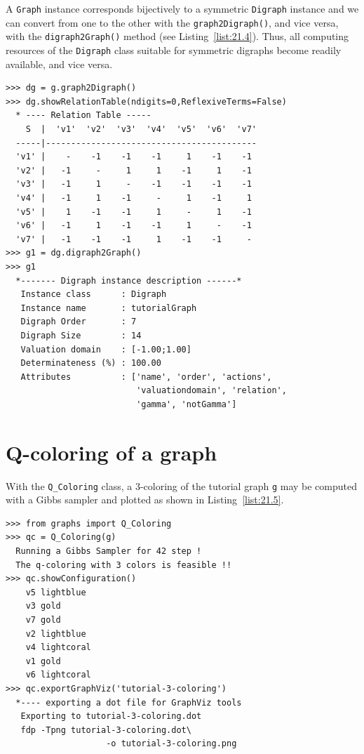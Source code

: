 A \texttt{Graph} instance corresponds bijectively to a symmetric \texttt{Digraph} instance and we can convert from one to the other with the \texttt{graph2Digraph()}, and vice versa, with the \texttt{digraph2Graph()} method (see Listing~\vref{list:21.4}). Thus, all computing resources of the \texttt{Digraph} class suitable for symmetric digraphs become readily available, and vice versa.
\begin{lstlisting}[caption={Conversion between graphs and digraphs},label=list:21.4]
>>> dg = g.graph2Digraph()
>>> dg.showRelationTable(ndigits=0,ReflexiveTerms=False)
  * ---- Relation Table -----
    S  |  'v1'  'v2'  'v3'  'v4'  'v5'  'v6'  'v7'	  
  -----|------------------------------------------
  'v1' |    -    -1    -1    -1     1    -1    -1	 
  'v2' |   -1     -     1     1    -1     1    -1	 
  'v3' |   -1     1     -    -1    -1    -1    -1	 
  'v4' |   -1     1    -1     -     1    -1     1	 
  'v5' |    1    -1    -1     1     -     1    -1	 
  'v6' |   -1     1    -1    -1     1     -    -1	 
  'v7' |   -1    -1    -1     1    -1    -1     -
>>> g1 = dg.digraph2Graph()
>>> g1
  *------- Digraph instance description ------*
   Instance class      : Digraph
   Instance name       : tutorialGraph
   Digraph Order       : 7
   Digraph Size        : 14
   Valuation domain    : [-1.00;1.00]
   Determinateness (%) : 100.00
   Attributes          : ['name', 'order', 'actions',
                          'valuationdomain', 'relation',
                          'gamma', 'notGamma']
\end{lstlisting}

\section{Q-coloring of a graph}
\label{25.2}

With the \texttt{Q\_Coloring} class, a 3-coloring of the tutorial graph \texttt{g} may be computed with a Gibbs sampler \citep{GEM-1984} and plotted as shown in Listing~\vref{list:21.5}.
\begin{lstlisting}[caption={Computing a 3-coloring of the random graph \texttt{g}},label=list:21.5]
>>> from graphs import Q_Coloring
>>> qc = Q_Coloring(g)
  Running a Gibbs Sampler for 42 step !
  The q-coloring with 3 colors is feasible !!
>>> qc.showConfiguration()
    v5 lightblue
    v3 gold
    v7 gold
    v2 lightblue
    v4 lightcoral
    v1 gold
    v6 lightcoral
>>> qc.exportGraphViz('tutorial-3-coloring')
  *---- exporting a dot file for GraphViz tools
   Exporting to tutorial-3-coloring.dot
   fdp -Tpng tutorial-3-coloring.dot\
                    -o tutorial-3-coloring.png
\end{lstlisting}

